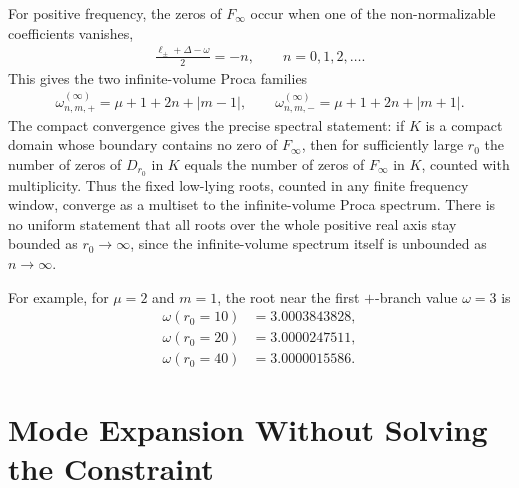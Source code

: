 \documentclass[11pt]{article}
\begin{document}
For positive frequency, the zeros of \(F_\infty\) occur when one of the
non-normalizable coefficients vanishes,
\begin{align}
\frac{\ell_\pm+\Delta-\omega}{2}=-n,\qquad n=0,1,2,\ldots .
\end{align}
This gives the two infinite-volume Proca families
\begin{align}
\omega_{n,m,+}^{(\infty)}=\mu+1+2n+|m-1|,\qquad
\omega_{n,m,-}^{(\infty)}=\mu+1+2n+|m+1|.
\end{align}
The compact convergence gives the precise spectral statement: if \(K\) is a
compact domain whose boundary contains no zero of \(F_\infty\), then for
sufficiently large \(r_0\) the number of zeros of \(D_{r_0}\) in \(K\) equals
the number of zeros of \(F_\infty\) in \(K\), counted with multiplicity.  Thus
the fixed low-lying roots, counted in any finite frequency window, converge as
a multiset to the infinite-volume Proca spectrum.  There is no uniform
statement that all roots over the whole positive real axis stay bounded as
\(r_0\to\infty\), since the infinite-volume spectrum itself is unbounded as
\(n\to\infty\).

For example, for \(\mu=2\) and \(m=1\), the root near the first \(+\)-branch
value \(\omega=3\) is
\begin{align}
\omega(r_0=10)&=3.0003843828,\\
\omega(r_0=20)&=3.0000247511,\\
\omega(r_0=40)&=3.0000015586 .
\end{align}

\section{Mode Expansion Without Solving the Constraint}
\end{document}
